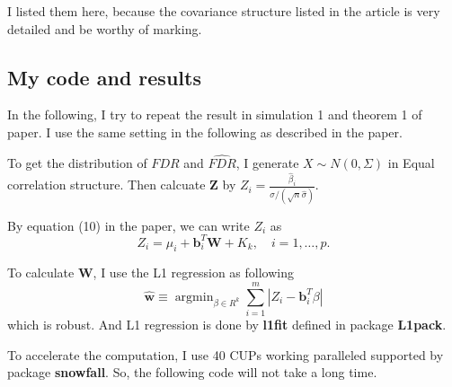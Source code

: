 \documentclass[]{article}
\begin{document}
I listed them here, because the covariance structure listed in the article is very detailed and be worthy of marking. 

\hypertarget{my-code-and-results}{%
\subsection{My code and results}\label{my-code-and-results}}

In the following, I try to repeat the result in simulation 1 and theorem
1 of paper. I use the same setting in the following as described in the
paper.

To get the distribution of \(FDR\) and \(\widehat{FDR}\), I generate
\(X\sim N(0, \Sigma)\) in Equal correlation structure. Then calcuate
\(\mathbf{Z}\) by
\(Z_i = \frac{\hat{\beta}_i}{\sigma/(\sqrt{n}\hat{\sigma})}\).

By equation (10) in the paper, we can write \(Z_i\) as 
\begin{equation}
  Z_i = \mu_i + \mathbf{b}_i^T \mathbf{W} + K_k, \quad i=1,\dots,p.
\end{equation}

To calculate \(\mathbf{W}\), I use the L1 regression as following
\begin{equation}
  \widehat{\mathbf{w}} \equiv \operatorname{argmin}_{\beta \in R^{k}} \sum_{i=1}^{m}\left|Z_{i}-\mathbf{b}_{i}^{T} \beta\right|
\end{equation} 
which is robust. And L1 regression is done by
\textbf{l1fit} defined in package \textbf{L1pack}. 

To accelerate the computation, I use 40 CUPs working paralleled supported by package \textbf{snowfall}. So, the following code will not take a long time. 
\end{document}
